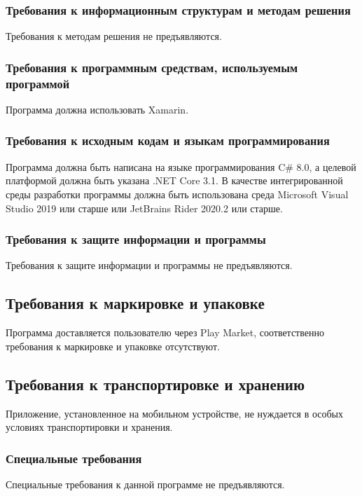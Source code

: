 \subsubsection{Требования к информационным структурам и методам решения}
Требования к методам решения не предъявляются.

\subsubsection{Требования к программным средствам, используемым программой}
Программа должна использовать Xamarin.

\subsubsection{Требования к исходным кодам и языкам программирования}
Программа должна быть написана на языке программирования C\# 8.0, а целевой платформой должна быть указана .NET Core 3.1. В качестве интегрированной среды разработки программы должна быть использована среда Microsoft Visual Studio 2019 или старше или JetBrains Rider 2020.2 или старше.

\subsubsection{Требования к защите информации и программы}
Требования к защите информации и программы не предъявляются.

\subsection{Требования к маркировке и упаковке}
Программа доставляется пользователю через Play Market, соответственно требования к маркировке и упаковке отсутствуют.

\subsection{Требования к транспортировке и хранению}
Приложение, установленное на мобильном устройстве, не нуждается в особых условиях транспортировки и хранения.

\subsubsection{Специальные требования}
Специальные требования к данной программе не предъявляются.

\clearpage